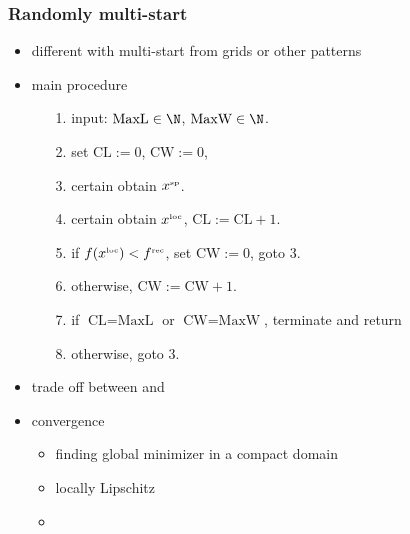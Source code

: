 	\subsubsection{Randomly multi-start}
	\begin{itemize}
		\item different with multi-start from grids or other patterns
		\item main procedure
		\begin{itemize}
			\item[1.] input: $\mbox{MaxL}\in\N$, $\mbox{MaxW}\in\N$.
			\item[2.] set $\mbox{CL} :=0$, $\mbox{CW} := 0$, 
			\item[3.] certain  obtain $x^{\tiny\mbox{sp}}$.
			\item[4.] certain  obtain $x^{\tiny\mbox{loc}}$,
			 $\mbox{CL}:=\mbox{CL}+1$.
			\item[5.] if $f(x^{\tiny\mbox{loc}})< f^{\tiny\mbox{rec}}$, set
				  $\mbox{CW} := 0$, goto 3.
			\item[6.] otherwise, $\mbox{CW}:=\mbox{CW}+1$.
			\item[7.] if $\mbox{CL}=\mbox{MaxL}$ or $\mbox{CW}=\mbox{MaxW}$, terminate
			and return 
			\item[8.] otherwise, goto 3.
		\end{itemize}
		\item trade off between  and 
		\item convergence
		\begin{itemize}
			\item finding global minimizer in a compact domain
			\item locally Lipschitz
			\item {} 
		\end{itemize}
	\end{itemize}

